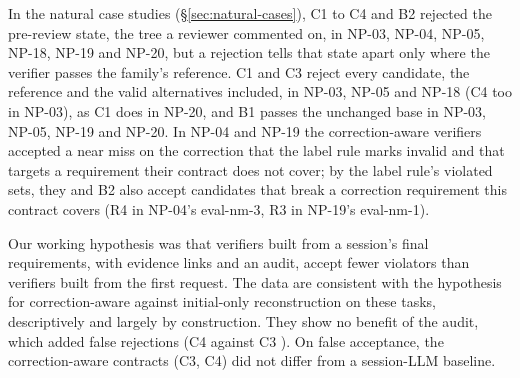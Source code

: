 In the natural case studies (\S\ref{sec:natural-cases}), C1 to C4 and B2 rejected the pre-review state, the tree a reviewer commented on, in NP-03, NP-04, NP-05, NP-18, NP-19 and NP-20, but a rejection tells that state apart only where the verifier passes the family's reference. C1 and C3 reject every candidate, the reference and the valid alternatives included, in NP-03, NP-05 and NP-18 (C4 too in NP-03), as C1 does in NP-20, and B1 passes the unchanged base in NP-03, NP-05, NP-19 and NP-20. In NP-04 and NP-19 the correction-aware verifiers accepted a near miss on the correction that the label rule marks invalid and that targets a requirement their contract does not cover; by the label rule's violated sets, they and B2 also accept candidates that break a correction requirement this contract covers (R4 in NP-04's eval-nm-3, R3 in NP-19's eval-nm-1).

Our working hypothesis was that verifiers built from a session's final requirements, with evidence links and an audit, accept fewer violators than verifiers built from the first request. The data are consistent with the hypothesis for correction-aware against initial-only reconstruction on these  tasks, descriptively and largely by construction. They show no benefit of the audit, which added false rejections (C4  against C3 ). On false acceptance, the correction-aware contracts (C3, C4) did not differ from a session-LLM baseline.

